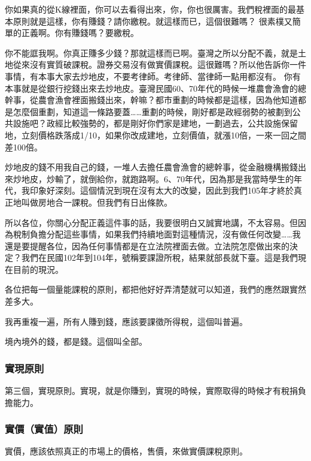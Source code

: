 \documentclass[oneside,sub3section]{ctexbook}
\begin{document}
你如果真的從K線裡面，你可以去看得出來，你，你也很厲害。我們稅裡面的最基本原則就是這樣，你有賺錢？請你繳稅。就這樣而已，這個很難嗎？ 很素樸又簡單的正義啊。你有賺錢嗎？要繳稅。

你不能誆我啊。你真正賺多少錢？那就這樣而已啊。臺灣之所以分配不義，就是土地從來沒有實質破課稅。證券交易沒有做實價課稅。這很難嗎？所以他告訴你一件事情，有本事大家去炒地皮，不要考律師。考律師、當律師一點用都沒有。
你有本事就是從銀行挖錢出來去炒地皮。臺灣民國60、70年代的時候一堆農會漁會的總幹事，從農會漁會裡面搬錢出來，幹嘛？都市重劃的時候都是這樣，因為他知道都是怎麼個重劃，知道這一條路要蓋\ldots\ldots 重劃的時候，剛好都是政經弱勢的被劃到公共設施吧？政經比較強勢的，都是剛好你們家是建地，一劃過去，公共設施保留地，立刻價格跌落成1/10，如果你改成建地，立刻價值，就漲10倍，一來一回之間差100倍。

炒地皮的錢不用我自己的錢，一堆人去擔任農會漁會的總幹事，從金融機構搬錢出來炒地皮，炒輸了，就倒給你，就跑路啊。6、70年代，因為那是我當時學生的年代，我印象好深刻。這個情況到現在沒有太大的改變，因此到我們105年才終於真正地叫做房地合一課稅。但我們有日出條款。

所以各位，你關心分配正義這件事的話，我要很明白又誠實地講，不太容易。但因為稅制負擔分配這些事情，如果我們持續地面對這種情況，沒有做任何改變\ldots\ldots 我還是要提醒各位，因為任何事情都是在立法院裡面去做。立法院怎麼做出來的決定？我們在民國102年到104年，號稱要課證所稅，結果就部長就下臺。這是我們現在目前的現況。

各位把每一個量能課稅的原則，都把他好好弄清楚就可以知道，我們的應然跟實然差多大。

我再重複一遍，所有人賺到錢，應該要課徵所得稅，這個叫普遍。

境內境外的錢，都是錢。這個叫全部。

\hypertarget{ux5be6ux73feux539fux5247}{%
\subsubsection{實現原則}\label{ux5be6ux73feux539fux5247}}

第三個，實現原則。實現，就是你賺到，實現的時候，實際取得的時候才有稅捐負擔能力。

\hypertarget{ux5be6ux50f9ux5be6ux503cux539fux5247}{%
\subsubsection{實價（實值）原則}\label{ux5be6ux50f9ux5be6ux503cux539fux5247}}

實價，應該依照真正的市場上的價格，售價，來做實價課稅原則。
\end{document}
